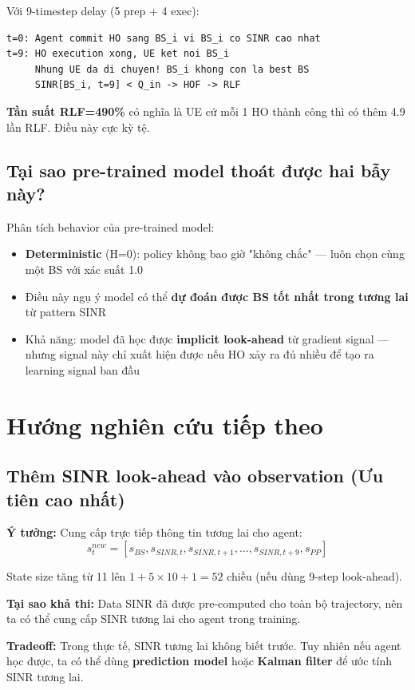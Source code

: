 \documentclass[11pt]{article}
\begin{document}
Với 9-timestep delay (5 prep + 4 exec):

\begin{lstlisting}
t=0: Agent commit HO sang BS_i vi BS_i co SINR cao nhat
t=9: HO execution xong, UE ket noi BS_i
     Nhung UE da di chuyen! BS_i khong con la best BS
     SINR[BS_i, t=9] < Q_in -> HOF -> RLF
\end{lstlisting}

\textbf{Tần suất RLF=490\%} có nghĩa là UE cứ mỗi 1 HO thành công thì có thêm 4.9 lần RLF. Điều này cực kỳ tệ.

\subsection{Tại sao pre-trained model thoát được hai bẫy này?}

Phân tích behavior của pre-trained model:
\begin{itemize}
  \item \textbf{Deterministic} (H=0): policy không bao giờ "không chắc" --- luôn chọn cùng một BS với xác suất 1.0
  \item Điều này ngụ ý model có thể \textbf{dự đoán được BS tốt nhất trong tương lai} từ pattern SINR
  \item Khả năng: model đã học được \textbf{implicit look-ahead} từ gradient signal --- nhưng signal này chỉ xuất hiện được nếu HO xảy ra đủ nhiều để tạo ra learning signal ban đầu
\end{itemize}

\section{Hướng nghiên cứu tiếp theo}

\subsection{Thêm SINR look-ahead vào observation (Ưu tiên cao nhất)}

\textbf{Ý tưởng:} Cung cấp trực tiếp thông tin tương lai cho agent:
\[
s_t^{new} = [s_{BS}, s_{SINR,t}, s_{SINR,t+1}, \ldots, s_{SINR,t+9}, s_{PP}]
\]

State size tăng từ 11 lên $1 + 5 \times 10 + 1 = 52$ chiều (nếu dùng 9-step look-ahead).

\textbf{Tại sao khả thi:} Data SINR đã được pre-computed cho toàn bộ trajectory, nên ta có thể cung cấp SINR tương lai cho agent trong training.

\textbf{Tradeoff:} Trong thực tế, SINR tương lai không biết trước. Tuy nhiên nếu agent học được, ta có thể dùng \textbf{prediction model} hoặc \textbf{Kalman filter} để ước tính SINR tương lai.
\end{document}
